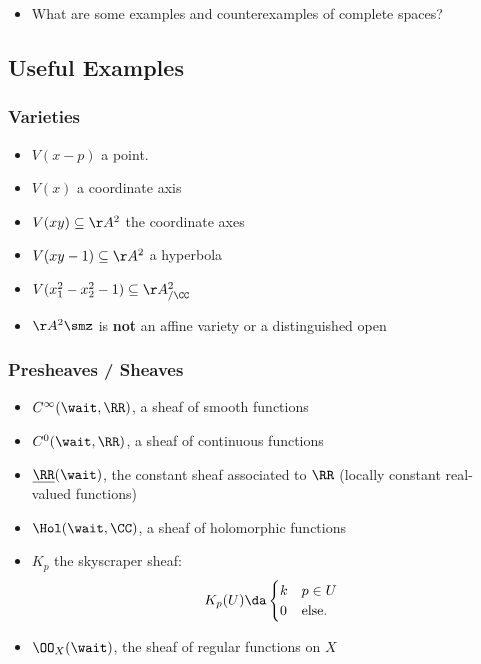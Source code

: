 \begin{itemize}
  \begin{itemize}
  \tightlist
  \item
    What are some examples and counterexamples of complete spaces?
  \end{itemize}
\end{itemize}

\newpage

\hypertarget{useful-examples}{%
\subsection{Useful Examples}\label{useful-examples}}

\hypertarget{varieties}{%
\subsubsection{Varieties}\label{varieties}}

\begin{itemize}
\tightlist
\item
  \(V(x-p)\) a point.
\item
  \(V(x)\) a coordinate axis
\item
  \(V(xy) \subseteq \AA^2\) the coordinate axes
\item
  \(V(xy-1) \subseteq \AA^2\) a hyperbola
\item
  \(V(x_1^2 - x_2^2 - 1) \subseteq \AA^2_{/\CC}\)
\item
  \(\AA^2\smz\) is \textbf{not} an affine variety or a distinguished
  open
\end{itemize}

\hypertarget{presheaves-sheaves}{%
\subsubsection{Presheaves / Sheaves}\label{presheaves-sheaves}}

\begin{itemize}
\tightlist
\item
  \(C^\infty(\wait, \RR)\), a sheaf of smooth functions
\item
  \(C^0(\wait, \RR)\), a sheaf of continuous functions
\item
  \(\underline{\RR}(\wait)\), the constant sheaf associated to \(\RR\)
  (locally constant real-valued functions)
\item
  \(\Hol(\wait, \CC)\), a sheaf of holomorphic functions
\item
  \(K_p\) the skyscraper sheaf:
  \begin{align*}  
  K_p(U) \da 
  \begin{cases}
  k & p\in U \\
  0 & \text{else}.
  \end{cases}
  \end{align*}
\item
  \(\OO_X(\wait)\), the sheaf of regular functions on \(X\)
\end{itemize}

